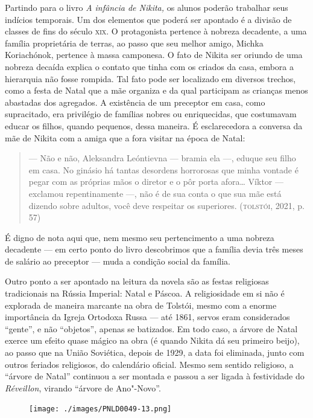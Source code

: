 \documentclass{article}
\begin{document}
Partindo para o livro \emph{A infância de Nikita,} os alunos poderão
trabalhar seus indícios temporais. Um dos elementos que poderá ser
apontado é a divisão de classes de fins do século \textsc{xix}. O protagonista
pertence à nobreza decadente, a uma família proprietária de terras, ao
passo que seu melhor amigo, Michka Koriachónok, pertence à massa
camponesa. O fato de Nikita ser oriundo de uma nobreza decaída explica o
contato que tinha com os criados da casa, embora a hierarquia não fosse
rompida. Tal fato pode ser localizado em diversos trechos, como a festa
de Natal que a mãe organiza e da qual participam as crianças menos
abastadas dos agregados. A existência de um preceptor em casa, como
supracitado, era privilégio de famílias nobres ou enriquecidas, que
costumavam educar os filhos, quando pequenos, dessa maneira. É
esclarecedora a conversa da mãe de Nikita com a amiga que a fora visitar
na época de Natal:

\begin{quote}
--- Não e não, Aleksandra Leóntievna --- bramia ela ---, eduque seu
filho em casa. No ginásio há tantas desordens horrorosas que minha
vontade é pegar com as próprias mãos o diretor e o pôr porta afora\ldots{}
Víktor --- exclamou repentinamente ---, não é de sua conta o que sua mãe
está dizendo sobre adultos, você deve respeitar os superiores.
(\textsc{tolstói}, 2021, p. 57)
\end{quote}

É digno de nota aqui que, nem mesmo seu pertencimento a uma nobreza
decadente --- em certo ponto do livro descobrimos que a família devia
três meses de salário ao preceptor --- muda a condição social da
família.

Outro ponto a ser apontado na leitura da novela são as festas
religiosas tradicionais na Rússia Imperial: Natal e Páscoa. A
religiosidade em si não é explorada de maneira marcante na obra de
Tolstói, mesmo com a enorme importância da Igreja Ortodoxa Russa --- até
1861, servos eram considerados ``gente'', e não ``objetos'', apenas se
batizados. Em todo caso, a árvore de Natal exerce um efeito quase mágico
na obra (é quando Nikita dá seu primeiro beijo), ao passo que na União
Soviética, depois de 1929, a data foi eliminada, junto com outros
feriados religiosos, do calendário oficial. Mesmo sem sentido religioso,
a ``árvore de Natal'' continuou a ser montada e passou a ser ligada à
festividade do \emph{Réveillon}, virando ``árvore de Ano"-Novo''.

\begin{figure}[ht!]
\texttt{[image: ./images/PNLD0049-13.png]}
\end{figure}
\end{document}
